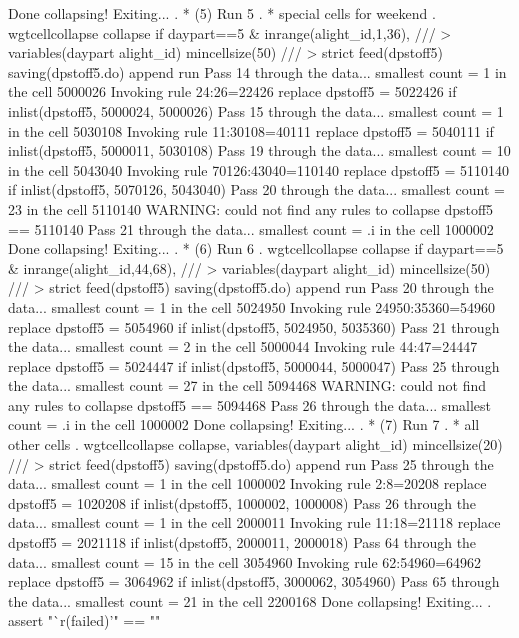   Done collapsing! Exiting...
{\smallskip}
. * (5) Run 5
. * special cells for weekend
. wgtcellcollapse collapse if daypart==5 \& inrange(alight_id,1,36), ///
>         variables(daypart alight_id) mincellsize(50) ///
>         strict feed(dpstoff5) saving(dpstoff5.do) append run
Pass 14 through the data...
  smallest count = 1 in the cell      5000026
  Invoking rule 24:26=22426
  replace dpstoff5 = 5022426 if inlist(dpstoff5, 5000024, 5000026)
Pass 15 through the data...
  smallest count = 1 in the cell      5030108
  Invoking rule 11:30108=40111
  replace dpstoff5 = 5040111 if inlist(dpstoff5, 5000011, 5030108)
\smallskip
\oom
\smallskip
Pass 19 through the data...
  smallest count = 10 in the cell      5043040
  Invoking rule 70126:43040=110140
  replace dpstoff5 = 5110140 if inlist(dpstoff5, 5070126, 5043040)
Pass 20 through the data...
  smallest count = 23 in the cell      5110140
  WARNING: could not find any rules to collapse dpstoff5 == 5110140
Pass 21 through the data...
  smallest count = .i in the cell      1000002
  Done collapsing! Exiting...
{\smallskip}
. * (6) Run 6
. wgtcellcollapse collapse if daypart==5 \& inrange(alight_id,44,68), ///
>         variables(daypart alight_id) mincellsize(50) ///
>         strict feed(dpstoff5) saving(dpstoff5.do) append run
Pass 20 through the data...
  smallest count = 1 in the cell      5024950
  Invoking rule 24950:35360=54960
  replace dpstoff5 = 5054960 if inlist(dpstoff5, 5024950, 5035360)
Pass 21 through the data...
  smallest count = 2 in the cell      5000044
  Invoking rule 44:47=24447
  replace dpstoff5 = 5024447 if inlist(dpstoff5, 5000044, 5000047)
\smallskip
\oom
\smallskip
Pass 25 through the data...
  smallest count = 27 in the cell      5094468
  WARNING: could not find any rules to collapse dpstoff5 == 5094468
Pass 26 through the data...
  smallest count = .i in the cell      1000002
  Done collapsing! Exiting...
{\smallskip}
. * (7) Run 7
. * all other cells
. wgtcellcollapse collapse, variables(daypart alight_id) mincellsize(20) ///
>         strict feed(dpstoff5) saving(dpstoff5.do) append run
Pass 25 through the data...
  smallest count = 1 in the cell      1000002
  Invoking rule 2:8=20208
  replace dpstoff5 = 1020208 if inlist(dpstoff5, 1000002, 1000008)
Pass 26 through the data...
  smallest count = 1 in the cell      2000011
  Invoking rule 11:18=21118
  replace dpstoff5 = 2021118 if inlist(dpstoff5, 2000011, 2000018)
\smallskip
\oom
\smallskip
Pass 64 through the data...
  smallest count = 15 in the cell      3054960
  Invoking rule 62:54960=64962
  replace dpstoff5 = 3064962 if inlist(dpstoff5, 3000062, 3054960)
Pass 65 through the data...
  smallest count = 21 in the cell      2200168
  Done collapsing! Exiting...
{\smallskip}
. assert "`r(failed)'" == ""
{\smallskip}
